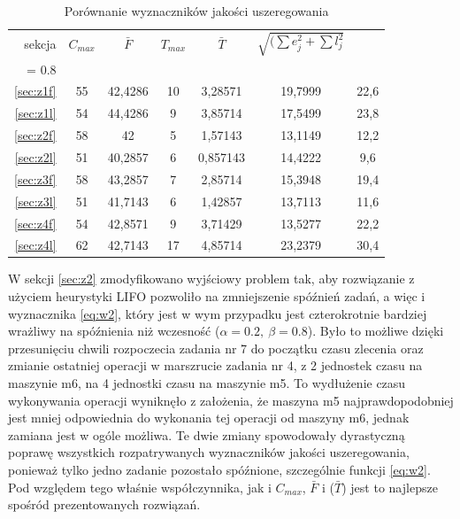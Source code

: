 \documentclass[twoside]{kInzynierka}
\begin{document}
\begin{table}[htb]
	\centering
	\caption{Porównanie wyznaczników jakości uszeregowania}
	\begin{tabular}{ r | c | c | c | c | c | c }
	sekcja        & \(C_{max}\)	& \(\bar{F}\)   & \(T_{max}\) & \(\bar{T}\) & \(\sqrt{(\sum e_j^2 + \sum l_j^2}\) & \( \alpha*\sum e_j + \beta*\sum l_j \Big|_{\substack{\alpha = 0.2\\ \beta = 0.8}} \) \\ \hline
	\ref{sec:z1f} & 55          & 42,4286       & 10          & 3,28571      & 19,7999      & 22,6 \\ 
	\ref{sec:z1l} & 54          & 44,4286       & 9           & 3,85714      & 17,5499      & 23,8 \\ \hline
	\ref{sec:z2f} & 58          & 42            & 5           & 1,57143      & 13,1149      & 12,2 \\ 
    \ref{sec:z2l} & 51          & 40,2857       & 6           & 0,857143     & 14,4222      & 9,6  \\ \hline
	\ref{sec:z3f} & 58          & 43,2857       & 7           & 2,85714      & 15,3948      & 19,4 \\ 
	\ref{sec:z3l} & 51          & 41,7143       & 6           & 1,42857      & 13,7113      & 11,6 \\ \hline
	\ref{sec:z4f} & 54          & 42,8571       & 9           & 3,71429      & 13,5277      & 22,2 \\ 
	\ref{sec:z4l} & 62          & 42,7143       & 17          & 4,85714      & 23,2379      & 30,4 \\ 
	\end{tabular}
\end{table}

W sekcji \ref{sec:z2} zmodyfikowano wyjściowy problem tak, aby rozwiązanie z użyciem heurystyki LIFO pozwoliło na zmniejszenie spóźnień zadań, a więc i wyznacznika \eqref{eq:w2}, który jest w wym przypadku jest czterokrotnie bardziej wrażliwy na spóźnienia niż wczesność (\(\alpha = 0.2,~\beta = 0.8\)). Było to możliwe dzięki przesunięciu chwili rozpoczecia zadania nr 7 do początku czasu zlecenia oraz zmianie ostatniej operacji w marszrucie zadania nr 4, z 2 jednostek czasu na maszynie m6, na 4 jednostki czasu na maszynie m5. To wydłużenie czasu wykonywania operacji wyniknęło z założenia, że maszyna m5 najprawdopodobniej jest mniej odpowiednia do wykonania tej operacji od maszyny m6, jednak zamiana jest w ogóle możliwa. Te dwie zmiany spowodowały dyrastyczną poprawę wszystkich rozpatrywanych wyznaczników jakości uszeregowania, ponieważ tylko jedno zadanie pozostało spóźnione, szczególnie funkcji \eqref{eq:w2}. Pod względem tego właśnie współczynnika, jak i \(C_{max}\), \(\bar{F}\)  i (\(\bar{T}\)) jest to najlepsze spośród prezentowanych rozwiązań.
\end{document}
